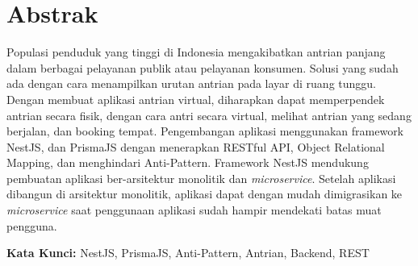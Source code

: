 \chapter*{Abstrak}
\noindent
\justifying
Populasi penduduk yang tinggi di Indonesia mengakibatkan antrian panjang dalam berbagai pelayanan publik atau pelayanan konsumen. Solusi yang sudah ada dengan cara menampilkan urutan antrian  pada layar di ruang tunggu. Dengan membuat aplikasi antrian virtual, diharapkan dapat memperpendek antrian secara fisik, dengan cara antri secara virtual, melihat antrian yang sedang berjalan, dan booking tempat. Pengembangan aplikasi menggunakan framework NestJS, dan PrismaJS dengan menerapkan RESTful API, Object Relational Mapping, dan menghindari Anti-Pattern. Framework NestJS mendukung pembuatan aplikasi ber-arsitektur monolitik dan \textit{microservice}. Setelah aplikasi dibangun di arsitektur monolitik, aplikasi dapat dengan mudah dimigrasikan ke \textit{microservice} saat penggunaan aplikasi sudah hampir mendekati batas muat pengguna.
\vspace{0.5 cm}
\begin{flushleft}
{\textbf{Kata Kunci:} NestJS, PrismaJS, Anti-Pattern, Antrian, Backend, REST}
\end{flushleft}